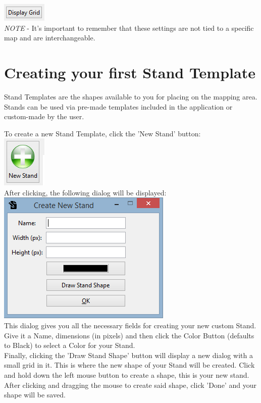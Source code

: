 \documentclass{report}
\begin{document}
\includegraphics{displaygrid.png}\\

\emph{NOTE} - It's important to remember that these settings are not tied to a specific map and are interchangeable.

\section{Creating your first Stand Template}
Stand Templates are the shapes available to you for placing on the mapping area.  Stands can be used via pre-made
templates included in the application or custom-made by the user.


To create a new Stand Template, click the 'New Stand' button:\\

\includegraphics{standtemplatebutton.png}\\


After clicking, the following dialog will be displayed:\\

\includegraphics{newstanddialog.png}\\


This dialog gives you all the necessary fields for creating your new custom Stand.  Give it a Name,
dimensions (in pixels) and then click the Color Button (defaults to Black) to select a Color for your Stand.\\


Finally, clicking the 'Draw Stand Shape' button will display a new dialog with a small grid in it.  This is where 
the new shape of your Stand will be created.  Click and hold down the left mouse button to create a 
shape, this is your new stand.  After clicking and dragging the mouse to create said shape, click
 'Done' and your shape will be saved.\\
\end{document}

